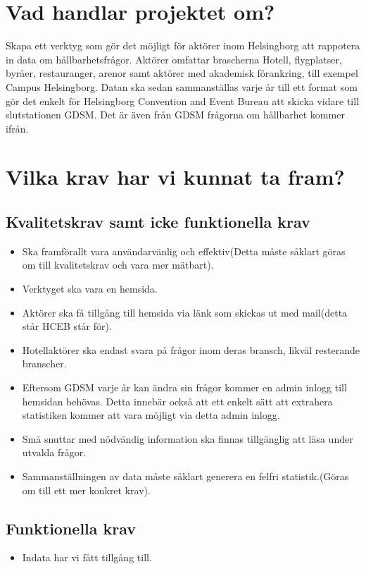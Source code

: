 \documentclass{article}
\date {#1}
\title {
    \documentTitle {Helsingborg Event and Convention Bureau}
    
    \documentDate {}
}
\begin{document}
\maketitle
\thispagestyle{empty}

\newpage




\newpage

\section{Vad handlar projektet om?}
    Skapa ett verktyg som gör det möjligt för aktörer inom Helsingborg att rappotera in data om hållbarhetsfrågor. Aktörer omfattar brascherna Hotell, flygplatser, byråer, restauranger, arenor samt aktörer med akademisk förankring, till exempel Campus Helsingborg. Datan ska sedan sammanställas varje år till ett format som gör det enkelt för Helsingborg Convention and Event Bureau att skicka vidare till slutstationen GDSM. Det är även från GDSM frågorna om hållbarhet kommer ifrån.
    \\
    
\section{Vilka krav har vi kunnat ta fram?}
    \subsection{Kvalitetskrav samt icke funktionella krav}
        \begin{itemize}
            \item Ska framförallt vara användarvänlig och effektiv(Detta måste såklart göras om till kvalitetskrav och vara mer mätbart).
            \\
            \item Verktyget ska vara en hemsida.
            \\
            \item Aktörer ska få tillgång till hemsida via länk som skickas ut med mail(detta står HCEB står för).
            \\
            \item Hotellaktörer ska endast svara på frågor inom deras bransch, likväl resterande branscher. 
            \\
            \item Eftersom GDSM varje år kan ändra sin frågor kommer en admin inlogg till hemsidan behövas. Detta innebär också att ett enkelt sätt att extrahera statistiken kommer att vara möjligt via detta admin inlogg. 
            \\
            \item Små snuttar med nödvändig information ska finnas tillgänglig att läsa under utvalda frågor.
            \\
             \item Sammanställningen av data måste såklart generera en felfri statistik.(Göras om till ett mer konkret krav).
        \end{itemize}
        
       \subsection{Funktionella krav}
            \begin{itemize}
             \item Indata har vi fått tillgång till.
             \end{itemize}
    
\end{document}

